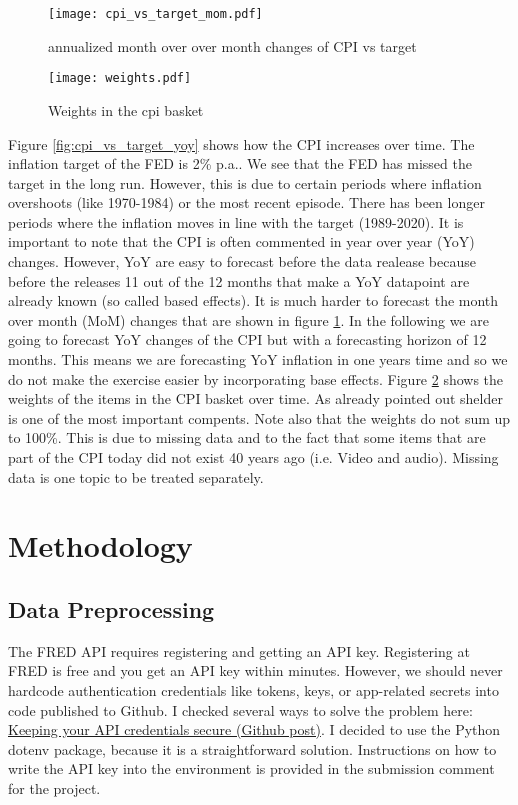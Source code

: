 \documentclass[12pt]{article}
\begin{document}
\begin{figure}[h]
    \centering
    \texttt{[image: cpi\_vs\_target\_mom.pdf]}
    \caption{annualized month over over month changes of CPI vs target}
    \label{fig:cpi_vs_target_mom}
\end{figure}

\begin{figure}[h]
    \centering
    \texttt{[image: weights.pdf]}
    \caption{Weights in the cpi basket}
    \label{fig:weights}
\end{figure}

Figure \ref{fig:cpi_vs_target_yoy} shows how the CPI increases over time. The inflation target of the FED is 2\% p.a.. We see that the FED has missed the target in the long run. However, this is due to certain periods where inflation overshoots (like 1970-1984) or the most recent episode. There has been longer periods where the inflation moves in line with the target (1989-2020). It is important to note that the CPI is often commented in year over year (YoY) changes. However, YoY are easy to forecast before the data realease because before the releases 11 out of the 12 months that make a YoY datapoint are already known (so called based effects). It is much harder to forecast the month over month (MoM) changes that are shown in figure  \ref{fig:cpi_vs_target_mom}. In the following we are going to forecast YoY changes of the CPI but with a forecasting horizon of 12 months. This means we are forecasting YoY inflation in one years time and so we do not make the exercise easier by incorporating base effects. 
Figure \ref{fig:weights} shows the weights of the items in the CPI basket over time. As already pointed out shelder is one of the most important compents. Note also that the weights do not sum up to 100\%. This is due to missing data and to the fact that some items that are part of the CPI today did not exist 40 years ago (i.e. Video and audio). Missing data is one topic to be treated separately. 


\section{Methodology}
\subsection{Data Preprocessing}

The FRED API requires registering and getting an API key. Registering at FRED is free and you get an API key within minutes. However, we should never hardcode authentication credentials like tokens, keys, or app-related secrets into code published to Github.  
I checked several ways to solve the problem here: \href{https://docs.github.com/en/rest/overview/keeping-your-api-credentials-secure?apiVersion=2022-11-28}{Keeping your API credentials secure (Github post)}. I decided to use the Python dotenv package, because it is a straightforward solution. Instructions on how to write the API key into the environment is provided in the submission comment for the project. 
\end{document}
